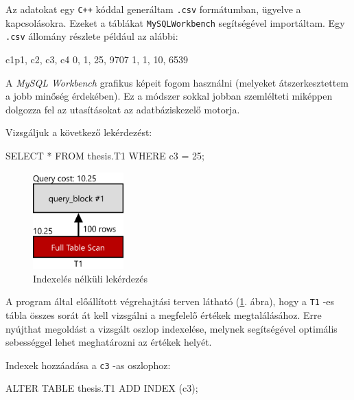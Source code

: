 


Az adatokat egy \texttt{C++} kóddal generáltam \texttt{.csv} formátumban, ügyelve a kapcsolásokra. Ezeket a táblákat \texttt{MySQLWorkbench} segítségével importáltam.
Egy \texttt{.csv} állomány részlete például az alábbi:
\begin{python}
c1p1, c2, c3, c4
0, 1, 25, 9707
1, 1, 10, 6539
\end{python}

\newpage


A \textit{MySQL Workbench} grafikus képeit fogom használni (melyeket átszerkesztettem a jobb minőség érdekében). Ez a módszer sokkal jobban szemlélteti miképpen dolgozza fel az utasításokat az adatbáziskezelő motorja.


Vizsgáljuk a következő lekérdezést:
\begin{python}
SELECT * FROM thesis.T1 WHERE c3 = 25; 
\end{python}
\begin{figure}[h!]
\centering
\includegraphics[width=3.5cm]{images/explain/1-1.png}
\caption{Indexelés nélküli lekérdezés}
\label{fig:explain_1_1}
\end{figure}

A program által előállított végrehajtási terven látható (\ref{fig:explain_1_1}. ábra), hogy a \texttt{T1} -es tábla összes sorát át kell vizsgálni a megfelelő értékek megtalálásához. Erre nyújthat megoldást a vizsgált oszlop indexelése, melynek segítségével optimális sebességgel lehet meghatározni az értékek helyét.

Indexek hozzáadása a \texttt{c3} -as oszlophoz:
\begin{python} 
ALTER TABLE thesis.T1 ADD INDEX (c3);
\end{python}

